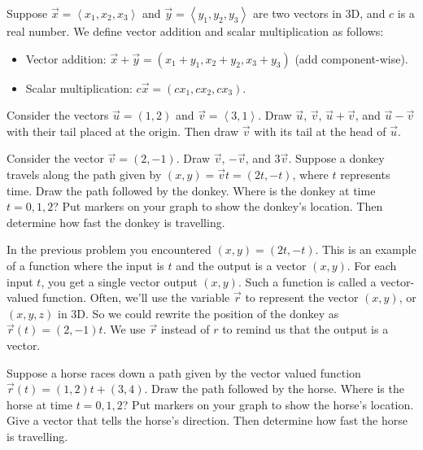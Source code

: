 \begin{definition}
Suppose $\vec x=\left<x_1,x_2,x_3\right>$ and $\vec y=\left<y_1,y_2,y_3\right>$ are two vectors in 3D, and $c$ is a real number. We define vector addition and scalar multiplication as follows:
\begin{itemize}
\item Vector addition: $\vec x+\vec y = (x_1+y_1,x_2+y_2,x_3+y_3)$ (add component-wise).
\item Scalar multiplication: $c\vec x = (cx_1,cx_2,cx_3)$.
\end{itemize}
\end{definition}


\begin{problem}
Consider the vectors $\vec u=(1,2)$ and $\vec v=\left<3,1\right>$.  Draw $\vec u$, $\vec v$, $\vec u+\vec v$, and $\vec u-\vec v$ with their tail placed at the origin.  Then draw $\vec v$ with its tail at the head of $\vec u$. 
\end{problem}

\begin{problem}
Consider the vector $\vec v=(2,-1)$.  Draw $\vec v$, $-\vec v$, and $3\vec v$. 
Suppose a donkey travels along the path given by $(x,y)=\vec v t = (2t,-t)$, where $t$ represents time. Draw the path followed by the donkey. Where is the donkey at time $t=0,1,2$? Put markers on your graph to show the donkey's location. Then determine how fast the donkey is travelling.
\end{problem}

In the previous problem you encountered $(x,y)=(2t,-t)$.  This is an example of a function where the input is $t$ and the output is a vector $(x,y)$.  For each input $t$, you get a single vector output $(x,y)$. Such a function is called a vector-valued function. Often, we'll use the variable $\vec r$ to represent the vector $(x,y)$, or $(x,y,z)$ in 3D.  So we could rewrite the position of the donkey as $\vec r(t)=(2,-1)t$. We use $\vec r$ instead of $r$ to remind us that the output is a vector.

\begin{problem}\label{horse line}
Suppose a horse races down a path given by the vector valued function $\vec r(t) = (1,2)t+(3,4)$.  
Draw the path followed by the horse. Where is the horse at time $t=0,1,2$? Put markers on your graph to show the horse's location. Give a vector that tells the horse's direction. Then determine how fast the horse is travelling.
\end{problem}

